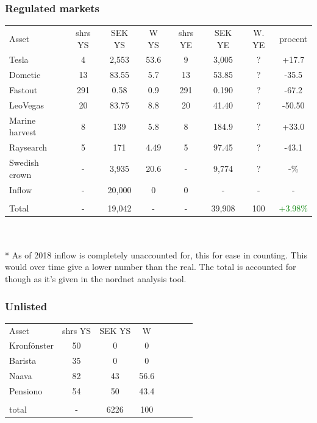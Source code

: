 \documentclass[a4paper]{article}
\begin{document}
\subsubsection{Regulated markets}
    
\begin{tabular}{l|c|c|c|c|c|c|c}
	Asset & shrs YS & SEK YS & W YS& shrs YE & SEK YE & W. YE & procent \\
    Tesla & 4 & 2,553 & 53.6 & 9 & 3,005 & ? & +17.7 \\
    Dometic & 13 & 83.55 & 5.7 & 13 & 53.85 & ? & -35.5 \\
    Fastout & 291 & 0.58 & 0.9 & 291 & 0.190 & ? & -67.2 \\
    LeoVegas & 20 & 83.75 & 8.8 & 20 & 41.40 & ? & -50.50 \\
    Marine harvest & 8 & 139 & 5.8 & 8 & 184.9 & ? & +33.0\\
    Raysearch & 5 & 171 & 4.49 & 5 & 97.45 & ? & -43.1\\

    Swedish crown & - & 3,935 & 20.6 & - & 9,774 & ? & -\% \\
    Inflow & - & 20,000 & 0 & 0 & - & - & - \\ \\
    Total & - & 19,042 & - & - & 39,908 & 100 & \textcolor{green}{+3.98\%}
    \end{tabular} \\
\\

* As of 2018 inflow is completely unaccounted for, this for ease in counting. This would over time give a lower number than the real. The total is accounted for though as it's given in the nordnet analysis tool.

\subsubsection{Unlisted}
\begin{tabular}{l|c|c|c|c|c|c|c}
	Asset & shrs YS & SEK YS & W \\
    Kronfönster & 50 & 0 & 0 \\ 
    Barista & 35 & 0 & 0 \\
    Naava & 82 & 43 & 56.6 \\ %
    Pensiono & 54 & 50 & 43.4\\ %
    \\
    total & - & 6226 & 100
    \end{tabular} \\
\\
\end{document}
